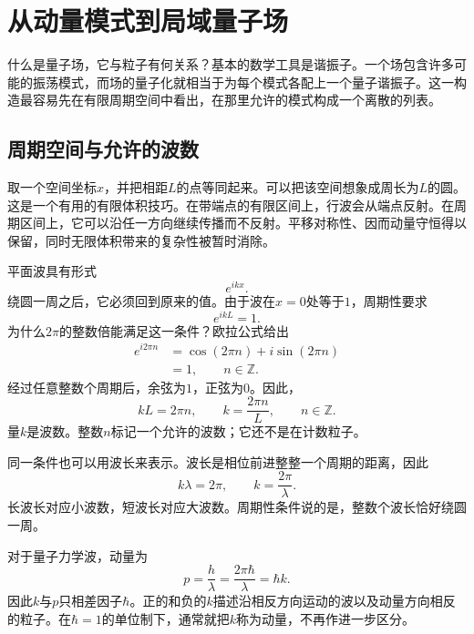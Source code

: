 \chapter{从动量模式到局域量子场}

什么是量子场，它与粒子有何关系？基本的数学工具是谐振子。一个场包含许多可能的振荡模式，而场的量子化就相当于为每个模式各配上一个量子谐振子。这一构造最容易先在有限周期空间中看出，在那里允许的模式构成一个离散的列表。

\section{周期空间与允许的波数}

取一个空间坐标\(x\)，并把相距\(L\)的点等同起来。可以把该空间想象成周长为\(L\)的圆。这是一个有用的有限体积技巧。在带端点的有限区间上，行波会从端点反射。在周期区间上，它可以沿任一方向继续传播而不反射。平移对称性、因而动量守恒得以保留，同时无限体积带来的复杂性被暂时消除。

平面波具有形式
\begin{equation}
e^{ikx}.
\end{equation}
绕圆一周之后，它必须回到原来的值。由于波在\(x=0\)处等于\(1\)，周期性要求
\begin{equation}
e^{ikL}=1.
\end{equation}
为什么\(2\pi\)的整数倍能满足这一条件？欧拉公式给出
\begin{align}
e^{i2\pi n}
&=\cos(2\pi n)+i\sin(2\pi n)\\
&=1,
\qquad n\in\mathbb Z.
\end{align}
经过任意整数个周期后，余弦为\(1\)，正弦为\(0\)。因此，
\begin{equation}
kL=2\pi n,
\qquad
k=\frac{2\pi n}{L},
\qquad n\in\mathbb Z.
\end{equation}
量\(k\)是波数。整数\(n\)标记一个允许的波数；它还不是在计数粒子。

同一条件也可以用波长来表示。波长是相位前进整整一个周期的距离，因此
\begin{equation}
k\lambda=2\pi,
\qquad
k=\frac{2\pi}{\lambda}.
\end{equation}
长波长对应小波数，短波长对应大波数。周期性条件说的是，整数个波长恰好绕圆一周。

对于量子力学波，动量为
\begin{equation}
p=\frac{h}{\lambda}
=\frac{2\pi\hbar}{\lambda}
=\hbar k.
\end{equation}
因此\(k\)与\(p\)只相差因子\(\hbar\)。正的和负的\(k\)描述沿相反方向运动的波以及动量方向相反的粒子。在\(\hbar=1\)的单位制下，通常就把\(k\)称为动量，不再作进一步区分。

